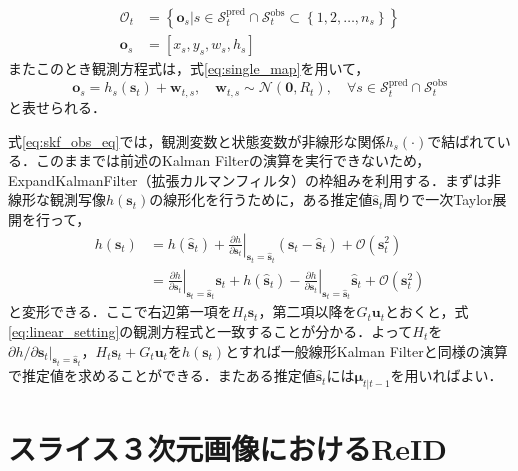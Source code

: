 \begin{equation}
    \label{eq:skf_obs}
    \begin{aligned}
        \mathcal{O}_t &= \left\{\left.\bm{o}_s\right| s \in \mathcal{S}_t^{\text{pred}} \cap \mathcal{S}_t^{\text{obs}} \subset \left\{1,2,\dots,n_s\right\} \right\}
        \\ \bm{o}_s &= \left[x_s, y_s, w_s, h_s\right]
    \end{aligned}    
\end{equation}
またこのとき観測方程式は，式\ref{eq:single_map}を用いて，
\begin{equation}
    \label{eq:skf_obs_eq}
    \bm{o}_s = h_s(\bm{s}_t) + \bm{w}_{t,s}, \quad \bm{w}_{t,s} \sim \mathcal{N}(\bm{0}, R_{t}),\quad \forall s \in \mathcal{S}_t^{\text{pred}} \cap \mathcal{S}_t^{\text{obs}}
\end{equation}
と表せられる．
\par
式\ref{eq:skf_obs_eq}では，観測変数と状態変数が非線形な関係$h_s(\cdot)$で結ばれている．このままでは前述のKalman Filterの演算を実行できないため，ExpandKalmanFilter（拡張カルマンフィルタ）の枠組みを利用する．まずは非線形な観測写像$h(\bm{s}_t)$の線形化を行うために，ある推定値$\hat{\bm{s}}_t$周りで一次Taylor展開を行って，
\begin{equation}
    \begin{aligned}
        h(\bm{s}_t) &= h(\hat{\bm{s}}_t) + \left.\frac{\partial h}{\partial \bm{s}_t}\right|_{\bm{s}_t=\hat{\bm{s}}_t} \left(\bm{s}_t - \hat{\bm{s}}_t\right) + \mathcal{O}(\bm{s}_t^2)
        \\ &= \left.\frac{\partial h}{\partial \bm{s}_t}\right|_{\bm{s}_t=\hat{\bm{s}}_t} \bm{s}_t + h(\hat{\bm{s}}_t) - \left.\frac{\partial h}{\partial \bm{s}_t}\right|_{\bm{s}_t=\hat{\bm{s}}_t} \hat{\bm{s}}_t + \mathcal{O}(\bm{s}_t^2)
    \end{aligned}
\end{equation}
と変形できる．ここで右辺第一項を$H_t \bm{s}_t$，第二項以降を$G_t \bm{u}_t$とおくと，式\ref{eq:linear_setting}の観測方程式と一致することが分かる．よって$H_t$を$\left.\partial h / \partial \bm{s}_t\right|_{\bm{s}_t=\hat{\bm{s}}_t}$，$H_t \bm{s}_t + G_t \bm{u}_t$を$h(\bm{s}_t)$とすれば一般線形Kalman Filterと同様の演算で推定値を求めることができる．またある推定値$\hat{\bm{s}}_t$には$\bm{\mu}_{t|t-1}$を用いればよい．

\section{スライス３次元画像におけるReID}

